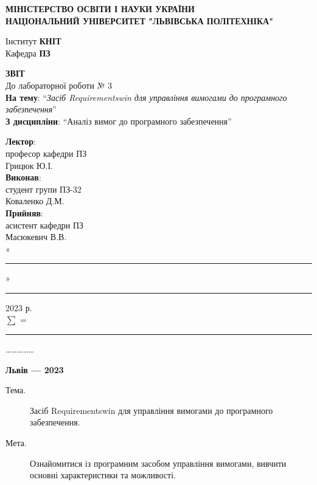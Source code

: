 \documentclass[14pt]{extreport}
\newcommand\subject{Аналіз вимог до програмного забезпечення}
\newcommand\lecturer{професор кафедри ПЗ\\Грицюк Ю.І.}
\newcommand\teacher{асистент кафедри ПЗ\\Масюкевич В.В.}
\newcommand\mygroup{ПЗ-32}
\newcommand\lab{3}
\newcommand\theme{Засіб Requirementswin для управління вимогами до програмного забезпечення}
\newcommand\purpose{Ознайомитися із програмним засобом управління вимогами,
	вивчити основні характеристики та можливості}
\begin{document}
\begin{normalsize}
	\begin{titlepage}
		\thispagestyle{empty}
		\begin{center}
			\textbf{МІНІСТЕРСТВО ОСВІТИ І НАУКИ УКРАЇНИ\\
				НАЦІОНАЛЬНИЙ УНІВЕРСИТЕТ "ЛЬВІВСЬКА ПОЛІТЕХНІКА"}
		\end{center}
		\begin{flushright}
			Інститут \textbf{КНІТ}\\
			Кафедра \textbf{ПЗ}
		\end{flushright}
		\vspace{140pt}
		\begin{center}
			\textbf{ЗВІТ}\\
			\vspace{10pt}
			До лабораторної роботи № \lab\\
			\textbf{На тему}: “\textit{\theme}”\\
			\textbf{З дисципліни}: “\subject”
		\end{center}
		\vspace{40pt}
		\begin{flushright}
			
			\textbf{Лектор}:\\
			\lecturer\\
			\vspace{10pt}
			\textbf{Виконав}:\\
			
			студент групи \mygroup\\
			Коваленко Д.М.\\
			\vspace{10pt}
			\textbf{Прийняв}:\\
			
			\teacher\\
			
			\vspace{28pt}
			«\rule{1cm}{0.15mm}» \rule{1.5cm}{0.15mm} 2023 р.\\
			$\sum$ = \rule{1cm}{0.15mm}……………\\
			
		\end{flushright}
		\vspace{\fill}
		\begin{center}
			\textbf{Львів — 2023}
		\end{center}
	\end{titlepage}
		
	\begin{description}
		\item[Тема.] \theme.
		\item[Мета.] \purpose.
	\end{description}


\end{normalsize}
\end{document}
